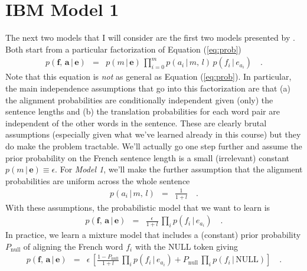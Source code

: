\documentclass[11pt]{article}
\newcommand{\eq}[1]{Equation (\ref{eq:#1})}
\newcommand{\bvec}[1]{\ensuremath{\boldsymbol{#1}}}
\newcommand{\code}[1]{{\sffamily #1}}
\begin{document}
\section{IBM Model 1}

The next two models that I will consider are the first two models presented by
\citet{ibm}.
Both start from a particular factorization of \eq{prob}
\begin{eqnarray}
p(\bvec{f},\,\bvec{a}\,|\,\bvec{e}) &=&
    p(m\,|\,\bvec{e}) \, \prod_{i=0}^m p(a_i\,|\,m,\,l)\,p(f_i\,|\,e_{a_i})
    \quad.
\end{eqnarray}
Note that this equation is \emph{not} as general as \eq{prob}.
In particular, the main independence assumptions that go into this
factorization are that (a) the alignment probabilities are conditionally
independent given (only) the sentence lengths and (b) the translation
probabilities for each word pair are independent of the other words in the
sentence.
These are clearly brutal assumptions (especially given what we've learned
already in this course) but they do make the problem tractable.
We'll actually go one step further \citep[following][]{ibm} and assume the
prior probability on the French sentence length is a small (irrelevant)
constant $p(m\,|\,\bvec{e}) \equiv \epsilon$.
For \emph{Model 1}, we'll make the further assumption that the alignment
probabilities are uniform across the whole sentence
\begin{eqnarray}
p(a_i\,|\,m,\,l) &=& \frac{1}{1+l} \quad.
\end{eqnarray}
With these assumptions, the probabilistic model that we want to learn is
\begin{eqnarray}
p(\bvec{f},\,\bvec{a}\,|\,\bvec{e}) &=&
    \frac{\epsilon}{1+l}\,\prod_i p(f_i\,|\,e_{a_i}) \quad.
\end{eqnarray}
In practice, we learn a mixture model that includes a (constant) prior
probability $P_\mathrm{null}$ of aligning the French word $f_i$ with the
\code{NULL} token giving
\begin{eqnarray}
p(\bvec{f},\,\bvec{a}\,|\,\bvec{e}) &=&
    \epsilon \,\left [\frac{1-P_\mathrm{null}}{1+l}\,\prod_ip(f_i\,|\,e_{a_i})
    + P_\mathrm{null}\,\prod_i p(f_i\,|\,\mathrm{NULL}) \right ] \quad.
\end{eqnarray}
\end{document}
